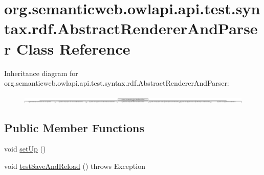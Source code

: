 \hypertarget{classorg_1_1semanticweb_1_1owlapi_1_1api_1_1test_1_1syntax_1_1rdf_1_1_abstract_renderer_and_parser}{\section{org.\-semanticweb.\-owlapi.\-api.\-test.\-syntax.\-rdf.\-Abstract\-Renderer\-And\-Parser Class Reference}
\label{classorg_1_1semanticweb_1_1owlapi_1_1api_1_1test_1_1syntax_1_1rdf_1_1_abstract_renderer_and_parser}
}
Inheritance diagram for org.\-semanticweb.\-owlapi.\-api.\-test.\-syntax.\-rdf.\-Abstract\-Renderer\-And\-Parser\-:\begin{figure}[H]
\begin{center}
\leavevmode
\includegraphics[height=0.297398cm]{classorg_1_1semanticweb_1_1owlapi_1_1api_1_1test_1_1syntax_1_1rdf_1_1_abstract_renderer_and_parser}
\end{center}
\end{figure}
\subsection*{Public Member Functions}
\begin{DoxyCompactItemize}
\item 
void \hyperlink{classorg_1_1semanticweb_1_1owlapi_1_1api_1_1test_1_1syntax_1_1rdf_1_1_abstract_renderer_and_parser_aea68ed149f93acfe8e39e46d77a74cd1}{set\-Up} ()
\item 
void \hyperlink{classorg_1_1semanticweb_1_1owlapi_1_1api_1_1test_1_1syntax_1_1rdf_1_1_abstract_renderer_and_parser_a50320c4512c5872c39e0d557f15ee361}{test\-Save\-And\-Reload} ()  throws Exception 
\end{DoxyCompactItemize}
